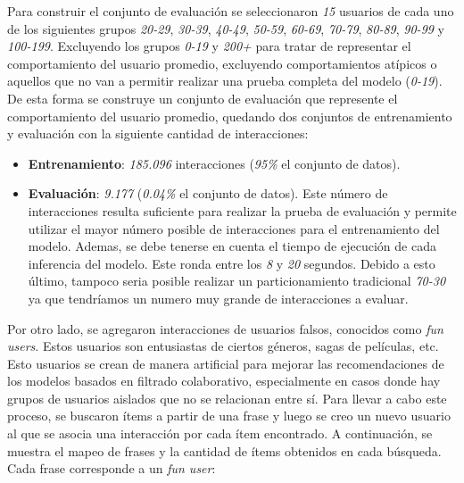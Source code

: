 \documentclass[11pt,a4paper,twoside]{thesis}
\begin{document}
Para construir el conjunto de evaluación se seleccionaron \textit{15} usuarios de cada uno de los siguientes grupos
\textit{20-29}, \textit{30-39}, \textit{40-49}, \textit{50-59}, \textit{60-69}, \textit{70-79}, \textit{80-89}, \textit{90-99} y \textit{100-199}. Excluyendo los grupos \textit{0-19} y \textit{200+} para tratar de representar el comportamiento del usuario promedio, excluyendo comportamientos atípicos o aquellos que no van a permitir realizar una prueba completa del modelo (\textit{0-19}). De esta forma se construye un conjunto de evaluación que represente el comportamiento del usuario promedio, quedando dos conjuntos de entrenamiento y evaluación con la siguiente cantidad de interacciones:

\begin{itemize}
	\item \textbf{Entrenamiento}: \textit{185.096} interacciones (\textit{95\%} el conjunto de datos).
	\item \textbf{Evaluación}: \textit{9.177} (\textit{0.04\%} el conjunto de datos). Este número de interacciones resulta suficiente para realizar la prueba de evaluación y permite utilizar el mayor número posible de interacciones para el entrenamiento del modelo. Ademas, se debe tenerse en cuenta el tiempo de ejecución de cada inferencia del modelo. Este ronda entre los \textit{8} y \textit{20} segundos. Debido a esto último, tampoco seria posible realizar un particionamiento tradicional \textit{70-30} ya que tendríamos un numero muy grande de interacciones a evaluar.
\end{itemize}

Por otro lado, se agregaron interacciones de usuarios falsos, conocidos como \textit{fun users}. Estos usuarios son entusiastas de ciertos géneros, sagas de películas, etc. Esto usuarios se crean de manera artificial para mejorar las recomendaciones de los modelos basados en filtrado colaborativo, especialmente en casos donde hay grupos de usuarios aislados que no se relacionan entre sí. Para llevar a cabo este proceso, se buscaron ítems a partir de una frase y luego se creo un nuevo usuario al que se asocia una interacción por cada ítem encontrado. A continuación, se muestra el mapeo de frases y la cantidad de ítems obtenidos en cada búsqueda. Cada frase corresponde a un \textit{fun user}:
\end{document}
